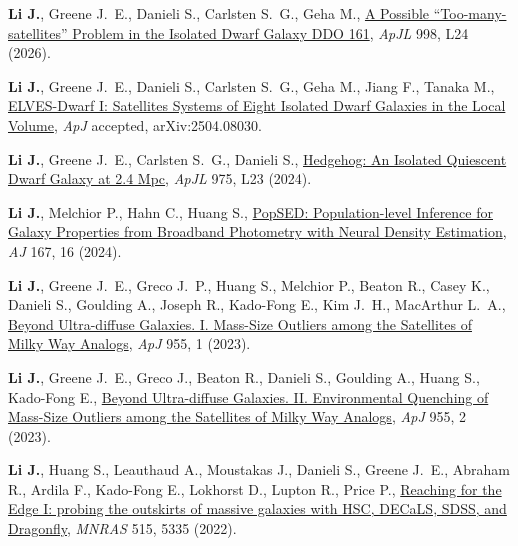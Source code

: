 
\item \textbf{Li J.}, Greene J.~E., Danieli S., Carlsten S.~G., Geha M., \href{https://ui.adsabs.harvard.edu/abs/2026ApJ...998L..24L}{A Possible ``Too-many-satellites'' Problem in the Isolated Dwarf Galaxy DDO 161}, \textit{ApJL} 998, L24 (2026).

\item \textbf{Li J.}, Greene J.~E., Danieli S., Carlsten S.~G., Geha M., Jiang F., Tanaka M., \href{https://ui.adsabs.harvard.edu/abs/2025arXiv250408030L}{ELVES-Dwarf I: Satellites Systems of Eight Isolated Dwarf Galaxies in the Local Volume}, \textit{ApJ} accepted, arXiv:2504.08030.

\item \textbf{Li J.}, Greene J.~E., Carlsten S.~G., Danieli S., \href{https://ui.adsabs.harvard.edu/abs/2024ApJ...975L..23L}{Hedgehog: An Isolated Quiescent Dwarf Galaxy at 2.4 Mpc}, \textit{ApJL} 975, L23 (2024).

\item \textbf{Li J.}, Melchior P., Hahn C., Huang S., \href{https://ui.adsabs.harvard.edu/abs/2024AJ....167...16L}{PopSED: Population-level Inference for Galaxy Properties from Broadband Photometry with Neural Density Estimation}, \textit{AJ} 167, 16 (2024).

\item \textbf{Li J.}, Greene J.~E., Greco J.~P., Huang S., Melchior P., Beaton R., Casey K., Danieli S., Goulding A., Joseph R., Kado-Fong E., Kim J.~H., MacArthur L.~A., \href{https://ui.adsabs.harvard.edu/abs/2023ApJ...955....1L}{Beyond Ultra-diffuse Galaxies. I. Mass-Size Outliers among the Satellites of Milky Way Analogs}, \textit{ApJ} 955, 1 (2023).

\item \textbf{Li J.}, Greene J.~E., Greco J., Beaton R., Danieli S., Goulding A., Huang S., Kado-Fong E., \href{https://ui.adsabs.harvard.edu/abs/2023ApJ...955....2L}{Beyond Ultra-diffuse Galaxies. II. Environmental Quenching of Mass-Size Outliers among the Satellites of Milky Way Analogs}, \textit{ApJ} 955, 2 (2023).

\item \textbf{Li J.}, Huang S., Leauthaud A., Moustakas J., Danieli S., Greene J.~E., Abraham R., Ardila F., Kado-Fong E., Lokhorst D., Lupton R., Price P., \href{https://ui.adsabs.harvard.edu/abs/2022MNRAS.515.5335L}{Reaching for the Edge I: probing the outskirts of massive galaxies with HSC, DECaLS, SDSS, and Dragonfly}, \textit{MNRAS} 515, 5335 (2022).

